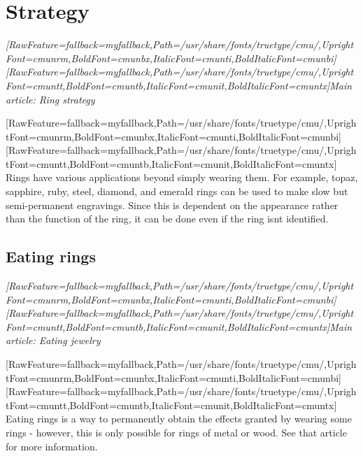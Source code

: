 \section{Strategy}
\label{6}

\begin{myquote}
\item{}{\itshape \allowbreak{}\setmainfont{cmunti.ttf}[RawFeature={fallback=myfallback},Path=/usr/share/fonts/truetype/cmu/,UprightFont=cmunrm,BoldFont=cmunbx,ItalicFont=cmunti,BoldItalicFont=cmunbi]\setmonofont{cmunti.ttf}[RawFeature={fallback=myfallback},Path=/usr/share/fonts/truetype/cmu/,UprightFont=cmuntt,BoldFont=cmuntb,ItalicFont=cmunit,BoldItalicFont=cmuntx]\itshape Main article: Ring strategy\footnotemark[112]}
\end{myquote}
\allowbreak{}\setmainfont{cmunrm.ttf}[RawFeature={fallback=myfallback},Path=/usr/share/fonts/truetype/cmu/,UprightFont=cmunrm,BoldFont=cmunbx,ItalicFont=cmunti,BoldItalicFont=cmunbi]\setmonofont{cmunrm.ttf}[RawFeature={fallback=myfallback},Path=/usr/share/fonts/truetype/cmu/,UprightFont=cmuntt,BoldFont=cmuntb,ItalicFont=cmunit,BoldItalicFont=cmuntx]
Rings have various applications beyond simply wearing them. For example, topaz, sapphire, ruby, steel, diamond, and emerald rings can be used to make slow but semi-{}permanent engravings\footnotemark[113]. Since this is dependent on the appearance rather than the function of the ring, it can be done even if the ring isn\textquotesingle{}t identified.



\subsection{Eating rings}
\label{7}

\begin{myquote}
\item{}{\itshape \allowbreak{}\setmainfont{cmunti.ttf}[RawFeature={fallback=myfallback},Path=/usr/share/fonts/truetype/cmu/,UprightFont=cmunrm,BoldFont=cmunbx,ItalicFont=cmunti,BoldItalicFont=cmunbi]\setmonofont{cmunti.ttf}[RawFeature={fallback=myfallback},Path=/usr/share/fonts/truetype/cmu/,UprightFont=cmuntt,BoldFont=cmuntb,ItalicFont=cmunit,BoldItalicFont=cmuntx]\itshape Main article: Eating jewelry\footnotemark[114]}
\end{myquote}
\allowbreak{}\setmainfont{cmunrm.ttf}[RawFeature={fallback=myfallback},Path=/usr/share/fonts/truetype/cmu/,UprightFont=cmunrm,BoldFont=cmunbx,ItalicFont=cmunti,BoldItalicFont=cmunbi]\setmonofont{cmunrm.ttf}[RawFeature={fallback=myfallback},Path=/usr/share/fonts/truetype/cmu/,UprightFont=cmuntt,BoldFont=cmuntb,ItalicFont=cmunit,BoldItalicFont=cmuntx]
Eating rings is a way to permanently obtain the effects granted by wearing some rings -{} however, this is only possible for rings of metal or wood. See that article for more information.



